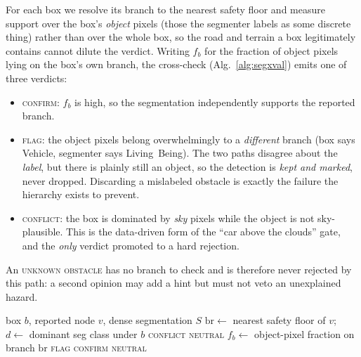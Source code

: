 \documentclass[conference]{IEEEtran}
\begin{document}
For each box we resolve its branch to the nearest safety floor and measure
support over the box's \emph{object} pixels (those the segmenter labels as some
discrete thing) rather than over the whole box, so the road and terrain a box
legitimately contains cannot dilute the verdict. Writing $f_b$ for the fraction
of object pixels lying on the box's own branch, the cross-check
(Alg.~\ref{alg:segxval}) emits one of three verdicts:
\begin{itemize}
\item \textsc{confirm}: $f_b$ is high, so the segmentation independently supports
the reported branch.
\item \textsc{flag}: the object pixels belong overwhelmingly to a \emph{different}
branch (box says \textsf{Vehicle}, segmenter says \textsf{Living~Being}). The two
paths disagree about the \emph{label}, but there is plainly still an object, so
the detection is \emph{kept and marked}, never dropped. Discarding a mislabeled
obstacle is exactly the failure the hierarchy exists to prevent.
\item \textsc{conflict}: the box is dominated by \emph{sky} pixels while the
object is not sky-plausible. This is the data-driven form of the ``car above the
clouds'' gate, and the \emph{only} verdict promoted to a hard rejection.
\end{itemize}
An \textsc{unknown obstacle} has no branch to check and is therefore never
rejected by this path: a second opinion may add a hint but must not veto an
unexplained hazard.

\begin{algorithm}[t]
\caption{Segmentation cross-validation of one box}
\label{alg:segxval}
\begin{algorithmic}[1]
\REQUIRE box $b$, reported node $v$, dense segmentation $S$
\STATE $\mathrm{br} \gets$ nearest safety floor of $v$;\quad
       $d \gets$ dominant seg class under $b$
    \RETURN \textsc{conflict} 
\ENDIF
{}
    \RETURN \textsc{neutral} 
\ENDIF
\STATE $f_b \gets$ object-pixel fraction on branch $\mathrm{br}$
    \RETURN \textsc{flag} 
    \RETURN \textsc{confirm}
\ELSE
    \RETURN \textsc{neutral}
\ENDIF
\end{algorithmic}
\end{algorithm}
\end{document}
